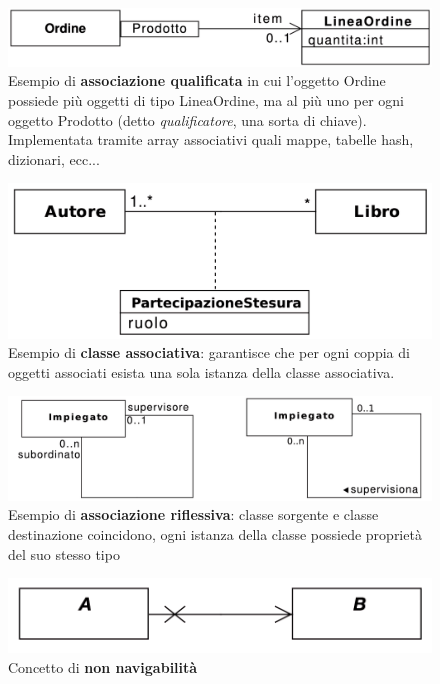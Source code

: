 \begin{figure}[H]
    \centering
    \includegraphics[width=0.75\linewidth]{assets/UML/class/class-12.png}
    \caption{Esempio di \textbf{associazione qualificata} in cui l'oggetto Ordine possiede più oggetti di tipo LineaOrdine, ma al più uno per ogni oggetto Prodotto (detto \textit{qualificatore}, una sorta di chiave). Implementata tramite array associativi quali mappe, tabelle hash, dizionari, ecc...}
\end{figure}

\vspace{20pt}

\begin{figure}[H]
    \centering
    \includegraphics[width=0.6\linewidth]{assets/UML/class/class-13.png}
    \caption{Esempio di \textbf{classe associativa}: garantisce che per ogni coppia di oggetti associati esista una sola istanza della classe associativa.}
\end{figure}

\vspace{20pt}

\begin{figure}[H]
    \centering
    \includegraphics[width=0.75\linewidth]{assets/UML/class/class-14.png}
    \caption{Esempio di \textbf{associazione riflessiva}: classe sorgente e classe destinazione coincidono, ogni istanza della classe possiede proprietà del suo stesso tipo}
\end{figure}

\vspace{20pt}

\begin{figure}[H]
    \centering
    \includegraphics[width=0.6\linewidth]{assets/UML/class/class-15.png}
    \caption{Concetto di \textbf{non navigabilità}}
\end{figure}

\newpage